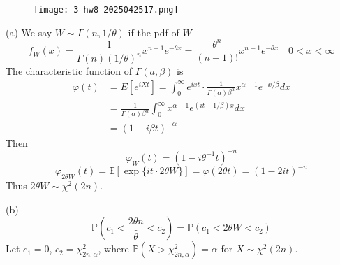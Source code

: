 \begin{exercise}
\begin{figure}[H]
\centering
\texttt{[image: 3-hw8-2025042517.png]}
\label{}
\end{figure}
\end{exercise}
(a)
We say $W \sim \Gamma(n, 1/\theta)$ if the pdf of $W$
\[
f_{W}(x)=\frac{1}{\Gamma(n) (1/\theta)^n} x^{n-1} e^{-\theta x }=\frac{\theta^{n}}{(n-1)!} x^{n-1} e^{-\theta x } \quad 0<x<\infty
\]
The characteristic function of $\Gamma(a, \beta)$ is
\[
\begin{aligned}
\varphi(t) & =E\left[e^{i X t}\right]=\int_0^{\infty} e^{i x t} \cdot \frac{1}{\Gamma(\alpha) \beta^\alpha} x^{\alpha-1} e^{-x / \beta} d x \\
& =\frac{1}{\Gamma(\alpha) \beta^\alpha} \int_0^{\infty} x^{\alpha-1} e^{(i t-1 / \beta) x} d x \\
& =(1-i \beta t)^{-\alpha}
\end{aligned}
\]
Then
\[
\varphi_{W}(t)=(1-i\theta ^{-1}t)^{-n}
\]
\[
\varphi_{2\theta W}(t)=\mathbb{E}[\exp \{ it\cdot2\theta W \}]=\varphi(2\theta t)=(1-2it)^{-n}
\]
Thus $2\theta W\sim \chi^{2}(2n)$.

(b)
\[
\mathbb{P}\left( c_1<\frac{2\theta n}{\widehat{\theta}}<c_2 \right)=\mathbb{P}(c_1<2\theta W<c_2)
\]
Let $c_1=0$, $c_2=\chi^{2}_{2n,\alpha}$, where $\mathbb{P}(X>\chi^{2}_{2n,\alpha})=\alpha$ for $X\sim \chi^{2}(2n)$.


